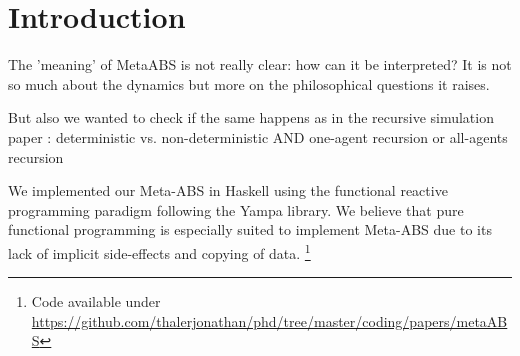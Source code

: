 \section{Introduction}
The 'meaning' of MetaABS is not really clear: how can it be interpreted?
It is not so much about the dynamics but more on the philosophical questions it raises.

But also we wanted to check if the same happens as in the recursive simulation paper \cite{gilmer_recursive_2000}: deterministic vs. non-deterministic AND one-agent recursion or all-agents recursion

We implemented our Meta-ABS in Haskell using the functional reactive programming paradigm following the Yampa library. We believe that pure functional programming is especially suited to implement Meta-ABS due to its lack of implicit side-effects and copying of data. 
\footnote{Code available under\\ \url{https://github.com/thalerjonathan/phd/tree/master/coding/papers/metaABS}}